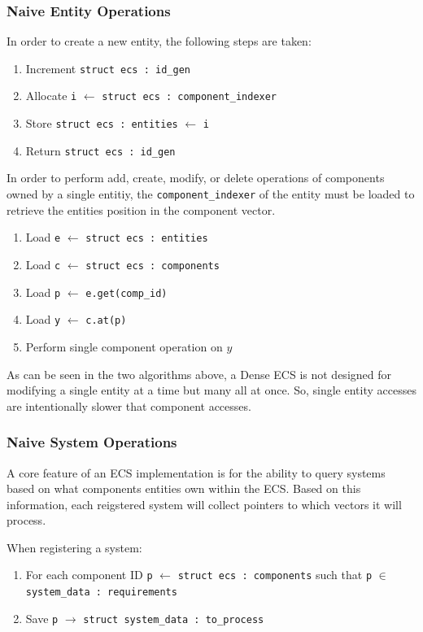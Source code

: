 \subsubsection{Naive Entity Operations}
In order to create a new entity, the following steps are taken:
\begin{enumerate}
    \item Increment \texttt{struct ecs : id\_gen}
    \item Allocate \texttt{i} $\leftarrow$ \texttt{struct ecs : component\_indexer} 
    \item Store \texttt{struct ecs : entities} $\leftarrow$ \texttt{i}
    \item Return \texttt{struct ecs : id\_gen}
\end{enumerate}

In order to perform add, create, modify, or delete operations of components owned by a single entitiy, the \texttt{component\_indexer} of the entity must be loaded to retrieve the entities position in the component vector.

\begin{enumerate}
    \item Load \texttt{e} $\leftarrow$ \texttt{struct ecs : entities}
    \item Load \texttt{c} $\leftarrow$ \texttt{struct ecs : components}
    \item Load \texttt{p} $\leftarrow$ \texttt{e.get(comp\_id)}
    \item Load \texttt{y} $\leftarrow$ \texttt{c.at(p)}
    \item Perform single component operation on $y$
\end{enumerate}

As can be seen in the two algorithms above, a Dense ECS is not designed for modifying a single entity at a time but many all at once. So, single entity accesses are intentionally slower that component accesses. \cite{EnTT_SparseSets}

\subsubsection{Naive System Operations}
A core feature of an ECS implementation is for the ability to query systems based on what components entities own within the ECS. Based on this information, each reigstered system will collect pointers to which vectors it will process.

When registering a system:
\begin{enumerate}
    \item For each component ID \texttt{p} $\leftarrow$ \texttt{struct ecs : components} such that \texttt{p} $\in$ \texttt{system\_data : requirements}
    \item Save \texttt{p} $\rightarrow$ \texttt{struct system\_data : to\_process }
\end{enumerate}

